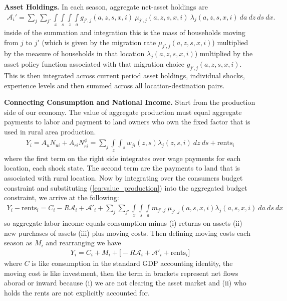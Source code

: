 \documentclass[12pt,pdftex]{article}
\begin{document}
\begin{onehalfspacing}
\textbf{Asset Holdings.} In each season, aggregate net-asset holdings are
\begin{align}
\mathcal{A}_i' = \sum_{j}\sum_{j'}   \int\limits_{x} \int\limits_{s} \int\limits_{z} \int\limits_{a} g_{j',j}(a, z, s, x, i) \  \mu_{j',j}(a, z, s, x, i) \ \lambda_j(a, z, s, x, i) \ da  \ dz \ ds \ dx.
\label{eq:aggregate_asset}
\end{align}
inside of the summation and integration this is the mass of households moving from $j$ to $j'$ (which is given by the migration rate $\mu_{j',j}(a, z, s, x, i)$)  multiplied by the measure of households in that location $\lambda_j(a, z, s, x, i)$) multiplied by the asset policy function associated with that migration choice $g_{j',j}(a, z, s, x, i)$. This is then integrated across current period asset holdings, individual shocks, experience levels and then summed across all location-destination pairs.

\textbf{Connecting Consumption and National Income.} Start from the production side of our economy. The value of aggregate production must equal aggregate payments to labor and payment to land owners who own the fixed factor that is used in rural area production.
\begin{align}
Y_i = A_u N_{ui} + A_{ri}N_{ri}^{\phi} = \sum_{j} \int\limits_{z} \int_{s} w_{ji}(z, s)\lambda_j(z, s,i)\ dz \ ds + \mbox{rents}_{i}
\label{eq:value_production}
\end{align}
where the first term on the right side integrates over wage payments for each location, each shock state. The second term are the payments to land that is associated with rural location. Now by integrating over the consumers budget constraint and substituting (\ref{eq:value_production}) into the aggregated budget constraint, we arrive at the following:
\begin{align}
Y_i - \mbox{rents}_{i} = C_i - R\mathcal{A}_i +  \mathcal{A'}_i  + \sum_{j}\sum_{j'} \int\limits_{x} \int\limits_{s} \int\limits_{a} m_{j',j} \ \mu_{j',j}(a, s, x, i) \lambda_j(a, s, x, i) \ da \ ds \ dx
\label{eq:expenditure_side_gdp}
\end{align}
so aggregate labor income equals consumption minus (i) returns on assets (ii) new purchases of assets (iii) plus moving costs. Then defining moving costs each season as $M_i$ and rearranging we have
\begin{align}
Y_i = C_i  + M_i + \bigg[-R\mathcal{A}_i +  \mathcal{A'}_i + \mbox{rents}_{i}\bigg]
\label{eq:income_side_gdp2}
\end{align}
where $C$ is like consumption in the standard GDP accounting identity, the moving cost is like investment, then the term in brackets represent net flows aborad or inward because (i) we are not clearing the asset market and (ii) who holds the rents are not explicitly accounted for.


\end{onehalfspacing}
\end{document}

